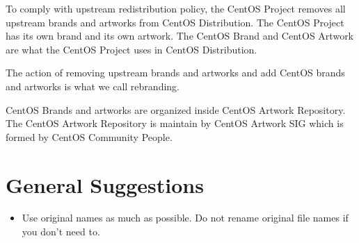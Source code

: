 
To comply with upstream redistribution policy, the CentOS Project
removes all upstream brands and artworks from CentOS Distribution. The
CentOS Project has its own brand and its own artwork. The CentOS Brand
and CentOS Artwork are what the CentOS Project uses in CentOS
Distribution. 

The action of removing upstream brands and artworks and add CentOS
brands and artworks is what we call rebranding.

CentOS Brands and artworks are organized inside CentOS Artwork
Repository.  The CentOS Artwork Repository is maintain by CentOS
Artwork SIG which is formed by CentOS Community People.

\section{General Suggestions}

\begin{itemize}

\item Use original names as much as possible. Do not rename original
file names if you don't need to.

\end{itemize}

